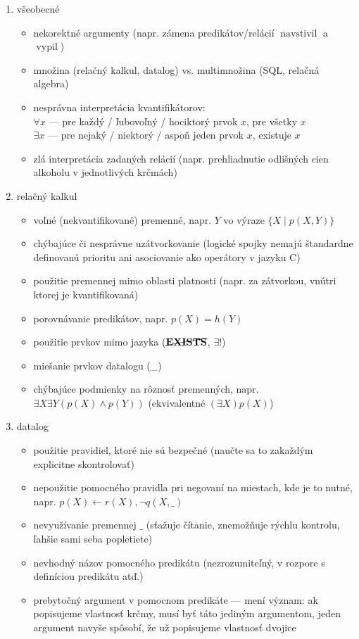 \documentclass[10pt, a4paper]{article}
\theoremstyle{definition}
\DeclareMathOperator{\navstivil}{navstivil}
\DeclareMathOperator{\vypil}{vypil}
\begin{document}
\begin{enumerate}
\item všeobecné
\begin{itemize}
\item nekorektné argumenty (napr. zámena predikátov/relácií $\navstivil$ a $\vypil$)
\item množina (relačný kalkul, datalog) vs. multimnožina (SQL, relačná algebra)
\item nesprávna interpretácia kvantifikátorov:\\
    $\forall x$ --- pre každý / ľubovoľný / hociktorý prvok $x$, pre všetky $x$\\
    $\exists x$ --- pre nejaký / niektorý / aspoň jeden prvok $x$, existuje $x$
\item zlá interpretácia zadaných relácií (napr. prehliadnutie odlišných cien alkoholu v jednotlivých krčmách)
\end{itemize}


\item relačný kalkul
\begin{itemize}
\item voľné (nekvantifikované) premenné, napr. $Y$ vo výraze $\{X \mid p(X,Y)\}$
\item chýbajúce či nesprávne uzátvorkovanie (logické spojky nemajú štandardne definovanú prioritu ani asociovanie ako operátory v jazyku C)
\item použitie premennej mimo oblasti platnosti (napr. za zátvorkou, vnútri ktorej je kvantifikovaná)
\item porovnávanie predikátov, napr. $p(X) = h(Y)$
\item použitie prvkov mimo jazyka ($\cancel\exists$, $\exists!$)
\item miešanie prvkov datalogu (\_)
\item chýbajúce podmienky na rôznosť premenných, napr. $\exists X\exists Y (p(X) \land p(Y))$ (ekvivalentné $(\exists X) p(X)$)
\end{itemize}

\item datalog
\begin{itemize}
\item použitie pravidiel, ktoré nie sú bezpečné (naučte sa to zakaždým explicitne skontrolovať)
\item nepoužitie pomocného pravidla pri negovaní na miestach, kde je to nutné, napr. $p(X)\leftarrow r(X), \lnot q(X, \_)$
\item nevyužívanie premennej $\_$ (sťažuje čítanie, znemožňuje rýchlu kontrolu, ľahšie sami seba popletiete)
\item nevhodný názov pomocného predikátu (nezrozumiteľný, v rozpore s definíciou predikátu atď.)
\item prebytočný argument v pomocnom predikáte --- mení význam: ak popisujeme vlastnosť krčmy, musí byť táto jediným argumentom, jeden argument navyše spôsobí, že už popisujeme vlastnosť dvojice
\end{itemize}


\end{enumerate}
\end{document}
